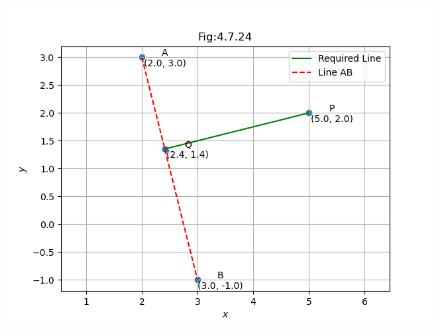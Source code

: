 \documentclass[journal]{IEEEtran}
\numberwithin{equation}{enumi}
\numberwithin{figure}{enumi}
\begin{document}
\begin{figure}[H]
    \centering
    \includegraphics[width=1.0\columnwidth]{figs/perpendicular2.png}
    \caption*{}
    \label{fig:}
\end{figure}
\end{document}
